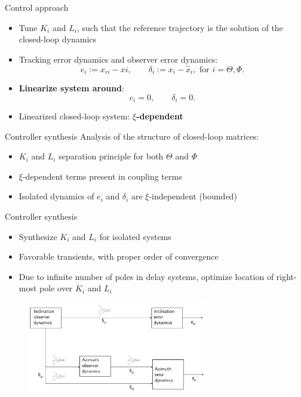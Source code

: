 \documentclass{beamer}
\begin{document}
\begin{frame}{Control approach}
	\begin{itemize}\setlength\itemsep{1.5em}
		\item Tune $K_i$ and $L_i$, such that the reference trajectory is the solution of the closed-loop dynamics
		\item Tracking error dynamics and observer error dynamics:
		\begin{equation*}
			e_i := x_{ri} - x{i}, \qquad \delta_i := x_i - \hat{x}_i, \text{ for } i=\Theta,\Phi.
		\end{equation*}
		\item \textbf{Linearize system around}:
		\begin{equation*}
			e_i = 0, \qquad \delta_i = 0.
		\end{equation*}
		\item Linearized closed-loop system: \textbf{$\xi$-dependent}
	\end{itemize}
\end{frame}



\begin{frame}{Controller synthesis}
\vspace{-1cm}
Analysis of the structure of closed-loop matrices:
\\
\vspace{0.5cm}\begin{itemize}\setlength\itemsep{3.5em}
	\item $K_i$ and $L_i$ separation principle for both $\Theta$ and $\Phi$
	\item $\xi$-dependent terms present in coupling terms
	\item Isolated dynamics of $e_i$ and $\delta_i$ are $\xi$-independent (bounded)
\end{itemize}
\end{frame}

\begin{frame}{Controller synthesis}
\begin{itemize}\setlength\itemsep{1.5em}
	\item Synthesize $K_i$ and $L_i$ for isolated systems
	\item Favorable transients, with proper order of convergence
	\item Due to infinite number of poles in delay systems, optimize location of right-most pole over $K_i$ and $L_i$
\end{itemize}
	\begin{figure}[ht]\centering
		\includegraphics[width=0.7\textwidth]{images/ISS.pdf}
	\end{figure}
\end{frame}
\end{document}

